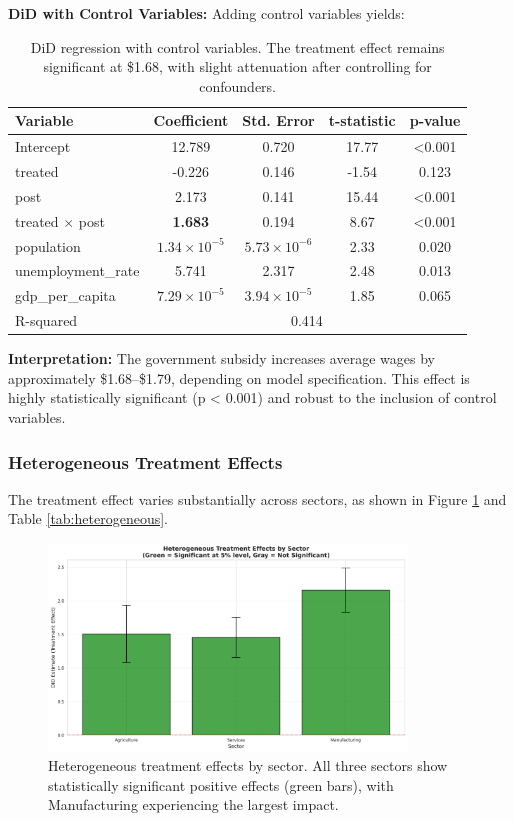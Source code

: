 \documentclass[a4paper,12pt,headsepline]{scrartcl} %
\begin{document}
\textbf{DiD with Control Variables:}
Adding control variables yields:

\begin{table}[H]
\centering
\small
\begin{tabular}{lcccc}
\toprule
Variable & Coefficient & Std. Error & t-statistic & p-value \\
\midrule
Intercept & 12.789 & 0.720 & 17.77 & <0.001 \\
treated & -0.226 & 0.146 & -1.54 & 0.123 \\
post & 2.173 & 0.141 & 15.44 & <0.001 \\
treated $\times$ post & \textbf{1.683} & 0.194 & 8.67 & <0.001 \\
population & $1.34 \times 10^{-5}$ & $5.73 \times 10^{-6}$ & 2.33 & 0.020 \\
unemployment\_rate & 5.741 & 2.317 & 2.48 & 0.013 \\
gdp\_per\_capita & $7.29 \times 10^{-5}$ & $3.94 \times 10^{-5}$ & 1.85 & 0.065 \\
\midrule
R-squared & \multicolumn{4}{c}{0.414} \\
\bottomrule
\end{tabular}
\caption{DiD regression with control variables. The treatment effect remains significant at \$1.68, with slight attenuation after controlling for confounders.}
\label{tab:did_controls}
\end{table}

\textbf{Interpretation:}
The government subsidy increases average wages by approximately \$1.68--\$1.79, depending on model specification. This effect is highly statistically significant (p < 0.001) and robust to the inclusion of control variables.

\subsubsection{Heterogeneous Treatment Effects}

The treatment effect varies substantially across sectors, as shown in Figure \ref{fig:heterogeneous} and Table \ref{tab:heterogeneous}.

\begin{figure}[H]
    \centering
    \includegraphics[width=0.85\textwidth]{heterogeneous_effects_plot.png}
    \caption{Heterogeneous treatment effects by sector. All three sectors show statistically significant positive effects (green bars), with Manufacturing experiencing the largest impact.}
    \label{fig:heterogeneous}
\end{figure}
\end{document}
